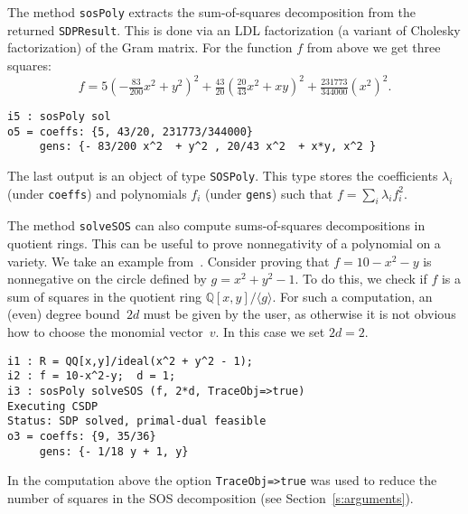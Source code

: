 \documentclass[11pt]{amsart}
\theoremstyle{plain}%
\theoremstyle{definition}
\theoremstyle{remark}
\newcommand{\SOS}{\textsc{SumsOfSquares}\xspace}
\newcommand{\QQ}{\mathbb{Q}}
\begin{document}
The method \verb|sosPoly| extracts the sum-of-squares decomposition from the returned \verb|SDPResult|.
This is done via an LDL factorization (a variant of Cholesky factorization) of the Gram matrix.
For the function $f$ from above we get three squares:
\[
  f = 5(-\tfrac{83}{200} x^{2}+y^{2})^{2} + \tfrac{43}{20}
  (\tfrac{20}{43}x^{2} + xy)^{2} + \tfrac{231773}{344000} (x^{2})^{2}.
\]
{\small
\begin{verbatim}
i5 : sosPoly sol
o5 = coeffs: {5, 43/20, 231773/344000}
     gens: {- 83/200 x^2  + y^2 , 20/43 x^2  + x*y, x^2 }
\end{verbatim}
}
\noindent
The last output is an object of type \verb|SOSPoly|.
This type stores the coefficients $\lambda_{i}$ (under \verb|coeffs|) and polynomials $f_{i}$ (under \verb|gens|) such that $f = \sum_{i}\lambda_{i}f_{i}^{2}$.

The method \verb|solveSOS| can also compute sums-of-squares decompositions in quotient rings.
This can be useful to prove nonnegativity of a polynomial on a variety.
We take an example from~\cite{parrilo2005exploiting}.
Consider proving that $f = 10{-}x^2{-}y$ is nonnegative on the circle defined by $g = x^2 {+} y^2 {-} 1$.
To do this, we check if $f$ is a sum of squares in the quotient ring $\QQ[x,y]/\langle g\rangle$.
For such a computation, an (even) degree bound~$2d$ must be given by the user, as otherwise it is not obvious how to choose the monomial vector~$v$.
In this case we set $2d=2$.
{\small
\begin{verbatim}
i1 : R = QQ[x,y]/ideal(x^2 + y^2 - 1);
i2 : f = 10-x^2-y;  d = 1;
i3 : sosPoly solveSOS (f, 2*d, TraceObj=>true)
Executing CSDP
Status: SDP solved, primal-dual feasible
o3 = coeffs: {9, 35/36}
     gens: {- 1/18 y + 1, y}
\end{verbatim}
}
\noindent
In the computation above the option \verb|TraceObj=>true| was used to reduce the number of squares in the SOS decomposition (see Section~\ref{s:arguments}).

\end{document}
